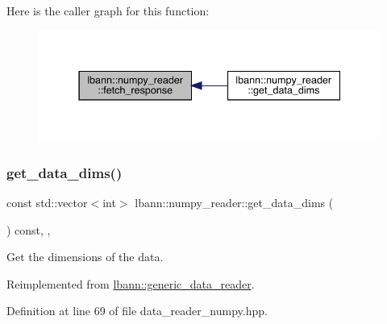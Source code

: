 Here is the caller graph for this function\+:\nopagebreak
\begin{figure}[H]
\begin{center}
\leavevmode
\includegraphics[width=337pt]{classlbann_1_1numpy__reader_ad7c3a680426ffcf467d74ba3a5e6eb20_icgraph}
\end{center}
\end{figure}
\mbox{\label{classlbann_1_1numpy__reader_aad4adc242e92334d016127cedc66fc70}} 
\subsubsection{\texorpdfstring{get\+\_\+data\+\_\+dims()}{get\_data\_dims()}}
{\footnotesize\ttfamily const std\+::vector$<$int$>$ lbann\+::numpy\+\_\+reader\+::get\+\_\+data\+\_\+dims (\begin{DoxyParamCaption}{ }\end{DoxyParamCaption}) const\hspace{0.3cm}{\ttfamily [inline]}, {\ttfamily [override]}, {\ttfamily [virtual]}}



Get the dimensions of the data. 



Reimplemented from \hyperlink{classlbann_1_1generic__data__reader_ae06ff27459ac4a5d8ac14655d4b31318}{lbann\+::generic\+\_\+data\+\_\+reader}.



Definition at line 69 of file data\+\_\+reader\+\_\+numpy.\+hpp.


